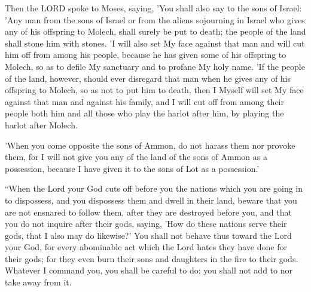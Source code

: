\vspace{5\baselineskip}

\begin{scripture}[Leviticus 20:1-5]
    Then the LORD spoke to Moses, saying,
    'You shall also say to the sons of Israel: 'Any man from the sons of Israel or from the aliens sojourning in Israel who gives any of his offspring to Molech, shall surely be put to death; the people of the land shall stone him with stones.
    'I will also set My face against that man and will cut him off from among his people, because he has given some of his offspring to Molech, so as to defile My sanctuary and to profane My holy name.
    'If the people of the land, however, should ever disregard that man when he gives any of his offspring to Molech, so as not to put him to death,
    then I Myself will set My face against that man and against his family, and I will cut off from among their people both him and all those who play the harlot after him, by playing the harlot after Molech.
\end{scripture}

\vspace{5\baselineskip}

\begin{scripture}[Deuteronomy 2:19]
    'When you come opposite the sons of Ammon, do not harass them nor provoke them, for I will not give you any of the land of the sons of Ammon as a possession, because I have given it to the sons of Lot as a possession.'
\end{scripture}

\vspace{2\baselineskip}

\begin{scripture}[Deuteronomy 12:29-32]
    “When the Lord your God cuts off before you the nations which you are going in to dispossess, and you dispossess them and dwell in their land,
    beware that you are not ensnared to follow them, after they are destroyed before you, and that you do not inquire after their gods, saying, 'How do these nations serve their gods, that I also may do likewise?'
    You shall not behave thus toward the Lord your God, for every abominable act which the Lord hates they have done for their gods; for they even burn their sons and daughters in the fire to their gods.
    Whatever I command you, you shall be careful to do; you shall not add to nor take away from it.
\end{scripture}


